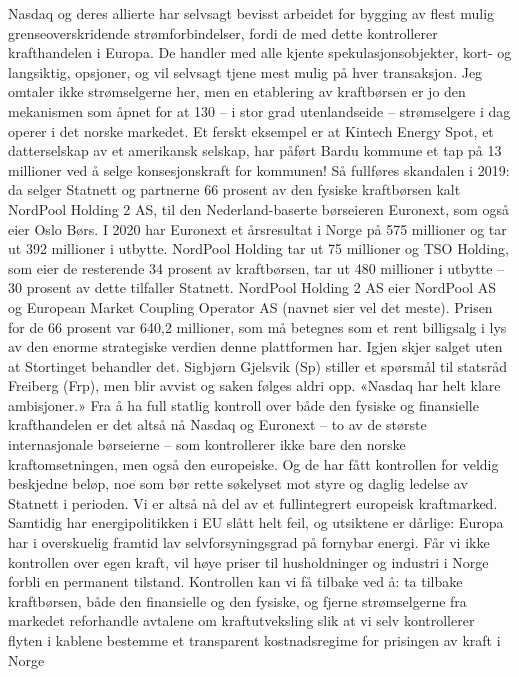 \documentclass[
]{book}
\begin{document}
Nasdaq og deres allierte har selvsagt bevisst arbeidet for bygging av flest mulig grenseoverskridende strømforbindelser, fordi de med dette kontrollerer krafthandelen i Europa. De handler med alle kjente spekulasjonsobjekter, kort- og langsiktig, opsjoner, og vil selvsagt tjene mest mulig på hver transaksjon.
Jeg omtaler ikke strømselgerne her, men en etablering av kraftbørsen er jo den mekanismen som åpnet for at 130 -- i stor grad utenlandseide -- strømselgere i dag operer i det norske markedet. Et ferskt eksempel er at Kintech Energy Spot, et datterselskap av et amerikansk selskap, har påført Bardu kommune et tap på 13 millioner ved å selge konsesjonskraft for kommunen!
Så fullføres skandalen i 2019: da selger Statnett og partnerne 66 prosent av den fysiske kraftbørsen kalt NordPool Holding 2 AS, til den Nederland-baserte børseieren Euronext, som også eier Oslo Børs.
I 2020 har Euronext et årsresultat i Norge på 575 millioner og tar ut 392 millioner i utbytte. NordPool Holding tar ut 75 millioner og TSO Holding, som eier de resterende 34 prosent av kraftbørsen, tar ut 480 millioner i utbytte -- 30 prosent av dette tilfaller Statnett. NordPool Holding 2 AS eier NordPool AS og European Market Coupling Operator AS (navnet sier vel det meste).
Prisen for de 66 prosent var 640,2 millioner, som må betegnes som et rent billigsalg i lys av den enorme strategiske verdien denne plattformen har. Igjen skjer salget uten at Stortinget behandler det. Sigbjørn Gjelsvik (Sp) stiller et spørsmål til statsråd Freiberg (Frp), men blir avvist og saken følges aldri opp.
«Nasdaq har helt klare ambisjoner.»
Fra å ha full statlig kontroll over både den fysiske og finansielle krafthandelen er det altså nå Nasdaq og Euronext -- to av de største internasjonale børseierne -- som kontrollerer ikke bare den norske kraftomsetningen, men også den europeiske. Og de har fått kontrollen for veldig beskjedne beløp, noe som bør rette søkelyset mot styre og daglig ledelse av Statnett i perioden.
Vi er altså nå del av et fullintegrert europeisk kraftmarked. Samtidig har energipolitikken i EU slått helt feil, og utsiktene er dårlige: Europa har i overskuelig framtid lav selvforsyningsgrad på fornybar energi. Får vi ikke kontrollen over egen kraft, vil høye priser til husholdninger og industri i Norge forbli en permanent tilstand.
Kontrollen kan vi få tilbake ved å:
ta tilbake kraftbørsen, både den finansielle og den fysiske, og fjerne strømselgerne fra markedet
reforhandle avtalene om kraftutveksling slik at vi selv kontrollerer flyten i kablene
bestemme et transparent kostnadsregime for prisingen av kraft i Norge
\end{document}
